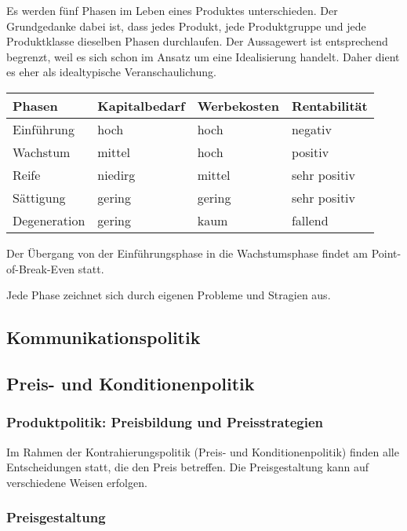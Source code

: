 Es werden fünf Phasen im Leben eines Produktes unterschieden. Der Grundgedanke dabei ist, dass jedes Produkt, jede Produktgruppe und jede Produktklasse dieselben Phasen durchlaufen. Der Aussagewert ist entsprechend begrenzt, weil es sich schon im Ansatz um eine Idealisierung handelt. Daher dient es eher als idealtypische Veranschaulichung.

\begin{tabular}{llll}
	Phasen & Kapitalbedarf & Werbekosten & Rentabilität \\
	\hline
	Einführung & hoch & hoch & negativ \\
	Wachstum & mittel & hoch & positiv \\
	Reife & niedirg & mittel & sehr positiv \\
	Sättigung & gering & gering & sehr positiv \\
	Degeneration & gering & kaum & fallend \\
\end{tabular}

Der Übergang von der Einführungsphase in die Wachstumsphase findet am Point-of-Break-Even statt.


Jede Phase zeichnet sich durch eigenen Probleme und Stragien aus. 

\subsection{Kommunikationspolitik}


\subsection{Preis- und Konditionenpolitik}

\subsubsection{Produktpolitik: Preisbildung und Preisstrategien}

Im Rahmen der Kontrahierungspolitik (Preis- und Konditionenpolitik) finden alle Entscheidungen statt, die den Preis betreffen. Die Preisgestaltung kann auf verschiedene Weisen erfolgen.

\subsubsection{Preisgestaltung}


